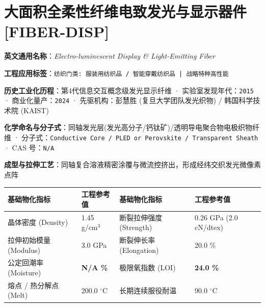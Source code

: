 \documentclass[11pt,openright,twoside,UTF8]{ctexbook}
\begin{document}
\section{大面积全柔性纤维电致发光与显示器件 [FIBER-DISP]}
\label{sec:fiber-disp}

\noindent\textbf{英文通用名称}：\textit{Electro-luminescent Display \& Light-Emitting Fiber}\par
\noindent\textbf{工程应用标签}：\texttt{纺织门类: 服装用纺织品 / 智能穿戴纺织品 | 战略特种高性能}\par
\noindent\textbf{历史工业化历程}：第4代信息交互概念级发光显示纤维 · 实验室发现年代：\texttt{2015} · 商业化量产：\texttt{2024} · 先驱机构：彭慧胜 (复旦大学团队发光织物) / 韩国科学技术院 (KAIST)\par
\noindent\textbf{化学命名与分子式}：同轴发光层(发光高分子/钙钛矿)/透明导电聚合物电极织物纤维 · 分子式：\texttt{Conductive Core / PLED or Perovskite / Transparent Sheath} · CAS 号：\texttt{N/A}\par
\noindent\textbf{成型与拉伸工艺}：同轴复合溶液精密涂覆与微流控挤出，形成经纬交织发光微像素点阵\par

\vspace{0.15cm}
\begin{center}
\small
\begin{tabularx}{\textwidth}{p{3.8cm}Xp{3.8cm}X}
\toprule
\textbf{基础物化指标} & \textbf{工程参考值} & \textbf{基础物化指标} & \textbf{工程参考值} \\
\midrule
晶体密度 (Density) & 1.45 g/cm$^3$ & 断裂拉伸强度 (Strength) & 0.26 GPa (2.0 cN/dtex) \\
拉伸初始模量 (Modulus) & 3.0 GPa & 断裂伸长率 (Elongation) & 20.0 \% \\
公定回潮率 (Moisture) & \textbf{N/A \%} & 极限氧指数 (LOI) & \textbf{24.0 \%} \\
熔点 / 热分解点 (Melt) & 200.0 $^\circ\mathrm{C}$ & 长期连续服役耐温 & 90.0 $^\circ\mathrm{C}$ \\
\bottomrule
\end{tabularx}
\end{center}
\vspace{0.15cm}
\end{document}
